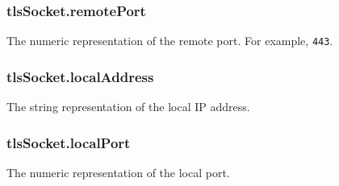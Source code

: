 \subsubsection{tlsSocket.remotePort}\label{tlssocket.remoteport}

The numeric representation of the remote port. For example,
\texttt{443}.

\subsubsection{tlsSocket.localAddress}\label{tlssocket.localaddress}

The string representation of the local IP address.

\subsubsection{tlsSocket.localPort}\label{tlssocket.localport}

The numeric representation of the local port.
